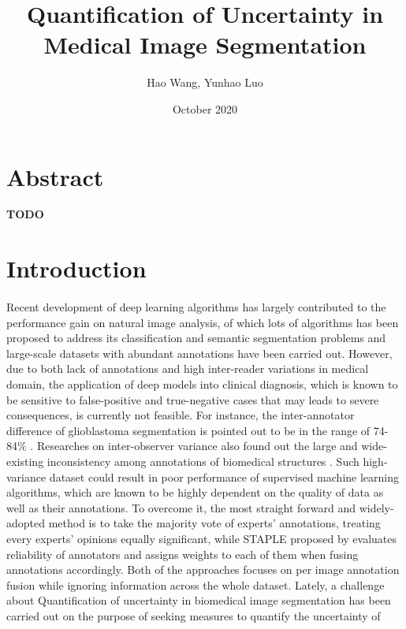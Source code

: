 \documentclass[12pt]{extarticle}
\title{Quantification of Uncertainty in Medical Image Segmentation}
\author{Hao Wang, Yunhao Luo}
\date{October 2020}
\begin{document}
\maketitle
\section*{Abstract}
\textbf{TODO}
\section{Introduction}
\paragraph{}
Recent development of deep learning algorithms has largely contributed to
the performance gain on natural image analysis, of which lots
of algorithms has been proposed to address its classification and semantic
segmentation problems and large-scale datasets with abundant annotations have been
carried out\cite{nair_precup_arnold_arbel_2020}.
However, due to
both lack of annotations and high inter-reader variations\cite{zhang2020disentangling}
in medical domain, the application of deep models into clinical diagnosis,
which is known to be sensitive to false-positive and true-negative cases that may leads
to severe consequences, is currently not feasible. 
For instance, the inter-annotator difference of glioblastoma segmentation
is pointed out to be in the range of 74-84\% \cite{6975210}.
Researches on inter-observer variance also found out
the large and wide-existing inconsistency among annotations of biomedical structures
\cite{Variability2019}\cite{interobserver2018}. Such high-variance dataset 
could result in poor performance of supervised machine learning algorithms,
which are known to be highly dependent on the quality of data as well as their annotations.
To overcome it, the most straight forward and widely-adopted method 
is to take the majority vote of experts' annotations, treating every 
experts' opinions equally significant\cite{6975210}, while STAPLE proposed by \cite{STAPLE} 
evaluates reliability of annotators and assigns weights to each of them when 
fusing annotations accordingly. Both of the approaches focuses on per image annotation fusion
while ignoring information across the whole dataset\cite{zhang2020disentangling}.
Lately, a challenge about Quantification of uncertainty 
in biomedical image segmentation has been carried
out on the purpose of seeking measures to quantify the uncertainty of 
\end{document}
